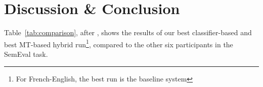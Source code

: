 

\section{Discussion \& Conclusion}
\label{discuss}


Table~\ref{tab:comparison}, after \cite{SEMEVAL2014TASK5}, shows the
results of our best classifier-based and best MT-based hybrid
run\footnote{For French-English, the best run is the baseline system},
compared to the other six participants in the SemEval task.

